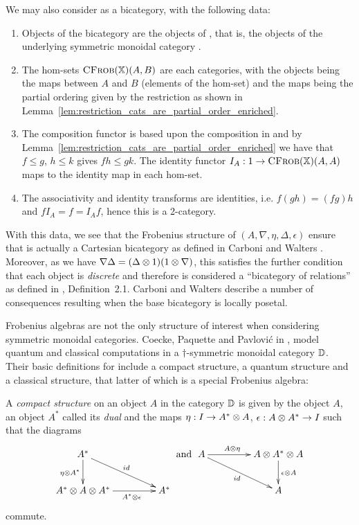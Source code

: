 We may also consider \CFrob as a bicategory\cite{leinster1998basic}, with the following data:
\begin{enumerate}[{(}i{)}]
  \item Objects of the bicategory are the objects of \CFrob, that is, the objects of the underlying
  symmetric monoidal category \X.
  \item The hom-sets $\textsc{CFrob}(\mathbb{X})(A,B)$ are each categories, with the objects being the maps between $A$
    and $B$ (elements of the hom-set) and the maps being the partial ordering given by the
    restriction as shown in Lemma~\ref{lem:restriction_cats_are_partial_order_enriched}.
  \item The composition functor is based upon the composition in \X and by
    Lemma~\ref{lem:restriction_cats_are_partial_order_enriched} we have that $f \le g$, $h\le k$
    gives $f h \le g k$. The identity functor $I_A:1\to \textsc{CFrob}(\mathbb{X})(A,A)$ maps to the identity map in
    each hom-set.
  \item The associativity and identity transforms are identities, i.e. $f(g h) = (f g) h$ and $f I_A
    = f = I_A f$, hence this is a 2-category.
\end{enumerate}
With this data, we see that the Frobenius structure of $(A,\nabla,\eta,\Delta,\epsilon)$ ensure that
\CFrob is actually a Cartesian bicategory as defined in Carboni and Walters
\cite{carboni1987cartesian}. Moreover, as we have $\nabla \Delta = (\Delta \otimes1) (1\otimes \nabla)$, this
satisfies the further condition that each object is \emph{discrete} and therefore is considered a
``bicategory of relations'' as defined in \cite{carboni1987cartesian}, Definition~2.1.
Carboni and Walters describe a number of consequences resulting when the base bicategory is locally
posetal.

Frobenius algebras are not the only structure of interest when considering symmetric monoidal
categories. Coecke, Paquette and Pavlovi\'c in  \cite{coecke08classical}, model quantum and
classical computations in a $\dagger$-symmetric monoidal category $\mathbb{D}$. Their basic definitions for
include a compact structure, a quantum structure and a classical structure, that latter of which is
a special Frobenius algebra:

\begin{definition}\label{def:compact_structure}
  A \emph{compact structure} on an object $A$ in the category $\mathbb{D}$ is given by the object $A$, an object
  $A^{*}$ called its \emph{dual} and the maps $\eta:I \to A^{*}\otimes A$, $\epsilon: A\otimes A^{*} \to I$
  such that the diagrams
  \[
    \xymatrix@C+20pt{
      A^{*} \ar[dr]^{id} \ar[d]_{\eta\*A^{*}} \\
      A^{*} \*A\*A^{*}  \ar[r]_(.6){A^{*} \*\epsilon} & A^{*}
    }
    \text{ and }
    \xymatrix@C+20pt{
      A \ar[r]^(.4){A\*\eta} \ar[dr]_{id} & A\* A^{*}\* A \ar[d]^{\epsilon\*A}\\
      & A
    }
  \]
  commute.
\end{definition}

